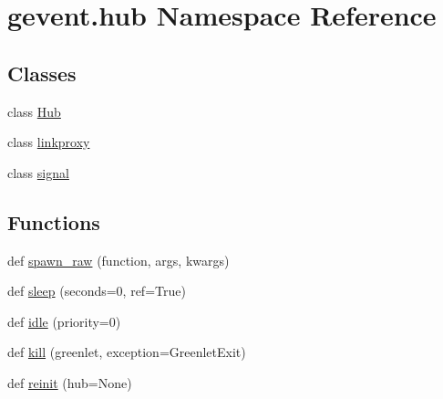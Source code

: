 \hypertarget{namespacegevent_1_1hub}{}\section{gevent.\+hub Namespace Reference}
\label{namespacegevent_1_1hub}
\subsection*{Classes}
\begin{DoxyCompactItemize}
\item 
class \hyperlink{classgevent_1_1hub_1_1_hub}{Hub}
\item 
class \hyperlink{classgevent_1_1hub_1_1linkproxy}{linkproxy}
\item 
class \hyperlink{classgevent_1_1hub_1_1signal}{signal}
\end{DoxyCompactItemize}
\subsection*{Functions}
\begin{DoxyCompactItemize}
\item 
def \hyperlink{namespacegevent_1_1hub_a4c863334efd5024caef0053418d24d3b}{spawn\+\_\+raw} (function, args, kwargs)
\item 
def \hyperlink{namespacegevent_1_1hub_adde072af231e1bac3f14955a7a0e0025}{sleep} (seconds=0, ref=True)
\item 
def \hyperlink{namespacegevent_1_1hub_a5bb5e229a2284a64a870e9a049e4d221}{idle} (priority=0)
\item 
def \hyperlink{namespacegevent_1_1hub_a9eeaa02acbf1c48cfa26dc84d245476a}{kill} (greenlet, exception=Greenlet\+Exit)
\item 
def \hyperlink{namespacegevent_1_1hub_a98badd351609faa2bd11b1ea5ee42e3c}{reinit} (hub=None)
\end{DoxyCompactItemize}
